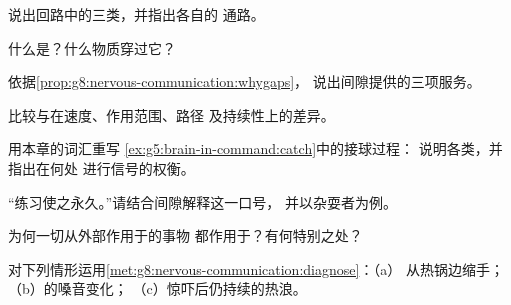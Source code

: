 \begin{exercise}[$\star$]\label{exo:g8:nervous-communication:3}
说出回路中的三类，并指出各自的
通路。
\end{exercise}

\begin{exercise}[$\star$]\label{exo:g8:nervous-communication:4}
什么是？什么物质穿过它？
\end{exercise}

\begin{exercise}[$\star$]\label{exo:g8:nervous-communication:5}
依据\cref{prop:g8:nervous-communication:whygaps}，
说出间隙提供的三项服务。
\end{exercise}

\begin{exercise}[$\star$]\label{exo:g8:nervous-communication:6}
比较与在速度、作用范围、路径
及持续性上的差异。
\end{exercise}

\begin{exercise}[$\star\star$]\label{exo:g8:nervous-communication:7}
用本章的词汇重写
\cref{ex:g5:brain-in-command:catch}中的接球过程：
说明各类，并指出在何处
进行信号的权衡。
\end{exercise}

\begin{exercise}[$\star\star$]\label{exo:g8:nervous-communication:8}
“练习使之永久。”请结合间隙解释这一口号，
并以杂耍者为例。
\end{exercise}

\begin{exercise}[$\star\star$]\label{exo:g8:nervous-communication:9}
为何一切从外部作用于的事物
都作用于？有何特别之处？
\end{exercise}

\begin{exercise}[$\star\star$]\label{exo:g8:nervous-communication:10}
对下列情形运用\cref{met:g8:nervous-communication:diagnose}：（a）
从热锅边缩手；（b）的嗓音变化；
（c）惊吓后仍持续的热浪。
\end{exercise}

